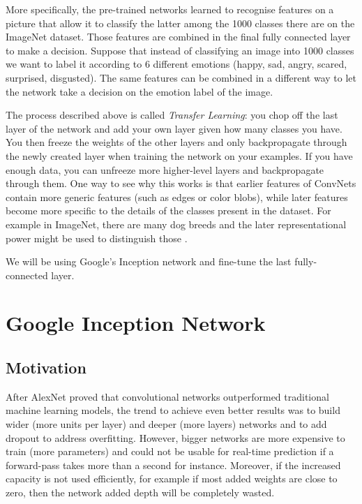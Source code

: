 More specifically, the pre-trained networks learned to recognise features on a picture that allow it to classify the latter among the 1000 classes there are on the ImageNet dataset. Those features are combined in the final fully connected layer to make a decision. Suppose that instead of classifying an image into 1000 classes we want to label it according to 6 different emotions (happy, sad, angry, scared, surprised, disgusted). The same features can be combined in a different way to let the network take a decision on the emotion label of the image.

The process described above is called {\em Transfer Learning}: you chop off the last layer of the network and add your own layer given how many classes you have. You then freeze the weights of the other layers and only backpropagate through the newly created layer when training the network on your examples. If you have enough data, you can unfreeze more higher-level layers and backpropagate through them. One way to see why this works is that earlier features of ConvNets contain more generic features (such as edges or color blobs), while later features become more specific to the details of the classes present in the dataset. For example in ImageNet, there are many dog breeds and the later representational power might be used to distinguish those \cite{transfer}.

We will be using Google's Inception network and fine-tune the last fully-connected layer.

\section{Google Inception Network}

\subsection{Motivation}
After AlexNet proved that convolutional networks outperformed traditional machine learning models, the trend to achieve even better results was to build wider (more units per layer) and deeper (more layers) networks and to add dropout to address overfitting. However, bigger networks are more expensive to train (more parameters) and could not be usable for real-time prediction if a forward-pass takes more than a second for instance. Moreover, if the increased capacity is not used efficiently, for example if most added weights are close to zero, then the network added depth will be completely wasted.


